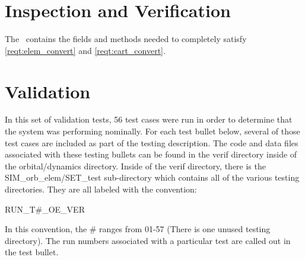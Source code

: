 \section{Inspection and Verification}\label{sec:inspect}

\label{inspect:data_conversion}
The \OrbitalElement\ contains the fields and methods needed to completely satisfy
\ref{reqt:elem_convert} and \ref{reqt:cart_convert}.

\section{Validation}\label{sec:test}

In this set of validation tests, 56 test cases were run in order to determine
that the system was performing nominally.  For each test bullet below, several
of those test cases are included as part of the testing description.  The code
and data files associated with these testing bullets can be found in the verif
directory inside of the orbital/dynamics directory.  Inside of the verif
directory, there is the SIM\_orb\_elem/SET\_test sub-directory which
contains all of the various testing directories.  They are all labeled with
the convention:

RUN\_T\#\_OE\_VER

In this convention, the \# ranges from 01-57 (There is one unused testing
directory).  The run numbers associated with a particular test are called out
in the test bullet.

